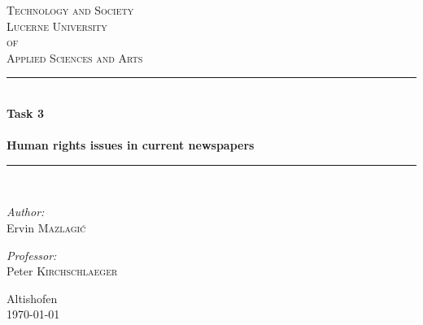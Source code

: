\begin{titlepage}

\begin{center}

\textsc{\LARGE Technology and Society}\\[1.5cm]

\textsc{\Large Lucerne University\\ of\\ Applied Sciences and Arts}\\[0.5cm]

\vfill{}

\newcommand{\HRule}{\rule{\linewidth}{0.5mm}}
\HRule \\[0.4cm]
{   \Huge \bfseries Task 3\\
        ~\\
        \large Human rights issues in current newspapers}\\[0.4cm]

\HRule \\[1.5cm]

\begin{minipage}{0.4\textwidth}
    \begin{flushleft} \large
        \emph{Author:}\\
        Ervin \textsc{Mazlagi\'c}\\
    \end{flushleft}
\end{minipage}
\hfill
\begin{minipage}{0.4\textwidth}
    \begin{flushright} \large
        \emph{Professor:} \\
        Peter \textsc{Kirchschlaeger} \\
    \end{flushright}
\end{minipage}

\vfill{}
\vfill{}
\vfill{}

{\large Altishofen\\ \today}

\end{center}

\end{titlepage}
